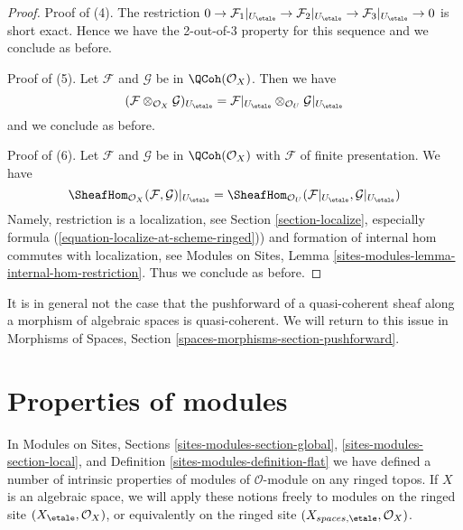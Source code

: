 \begin{proof}
\medskip\noindent
Proof of (4). The restriction
$0 \to \mathcal{F}_1|_{U_\etale} \to \mathcal{F}_2|_{U_\etale}
\to \mathcal{F}_3|_{U_\etale} \to 0$
is short exact. Hence we have the 2-out-of-3 property
for this sequence and we conclude as before.

\medskip\noindent
Proof of (5). Let $\mathcal{F}$ and $\mathcal{G}$ be in $\QCoh(\mathcal{O}_X)$.
Then we have
$$
(\mathcal{F} \otimes_{\mathcal{O}_X} \mathcal{G})_{U_\etale} =
\mathcal{F}|_{U_\etale} \otimes_{\mathcal{O}_U} \mathcal{G}|_{U_\etale}
$$
and we conclude as before.

\medskip\noindent
Proof of (6). Let $\mathcal{F}$ and $\mathcal{G}$
be in $\QCoh(\mathcal{O}_X)$ with $\mathcal{F}$
of finite presentation. We have
$$
\SheafHom_{\mathcal{O}_X}(\mathcal{F}, \mathcal{G})|_{U_\etale} =
\SheafHom_{\mathcal{O}_U}(\mathcal{F}|_{U_\etale}, \mathcal{G}|_{U_\etale})
$$
Namely, restriction is a localization, see
Section \ref{section-localize}, especially formula
(\ref{equation-localize-at-scheme-ringed})) and formation of internal
hom commutes with localization, see
Modules on Sites, Lemma \ref{sites-modules-lemma-internal-hom-restriction}.
Thus we conclude as before.
\end{proof}

\noindent
It is in general not the case that the pushforward of a quasi-coherent sheaf
along a morphism of algebraic spaces is quasi-coherent. We will return to this
issue in
Morphisms of Spaces, Section \ref{spaces-morphisms-section-pushforward}.




\section{Properties of modules}
\label{section-properties-modules}

\noindent
In
Modules on Sites, Sections
\ref{sites-modules-section-global},
\ref{sites-modules-section-local}, and
Definition \ref{sites-modules-definition-flat}
we have defined a number of intrinsic properties of modules of
$\mathcal{O}$-module on any ringed topos. If $X$ is an algebraic
space, we will apply these notions freely to modules on the ringed
site $(X_\etale, \mathcal{O}_X)$, or equivalently on the ringed site
$(X_{spaces, \etale}, \mathcal{O}_X)$.


